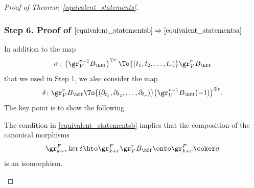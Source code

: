 \begin{proof}[Proof of Theorem~\ref{equivalent_statements}]
\subsubsection*{Step 6. Proof of $\eqref{equivalent_statementsb}\Rightarrow\eqref{equivalent_statementsa}$}
In addition to the map
\[
\sigma\colon \left(\gr^{r-1}_V B_\bff\right)^{\oplus r} \To{(t_1,t_2,\dots,t_r)} \gr^{r}_V B_\bff
\]
that we used in Step 1, we also consider the map
\[
\delta\colon \gr^r_V B_\bff \To{(\partial_{t_1},\partial_{t_2},\dots,\partial_{t_r})} \big(\gr^{r-1}_V B_\bff(-1)\big)^{\oplus r}.
\]
The key point is to show the following

\begin{claim*}
The condition in \eqref{equivalent_statementsb} implies that
the composition of the canonical morphisms
\begin{equation}\label{eq:ckc}
\gr^F_{k+r}\ker\delta \hto \gr^F_{k+r}\gr^r_V B_\bff \onto \gr^F_{k+r} \coker\sigma
\end{equation}
is an isomorphism.
\end{claim*}


\end{proof}
